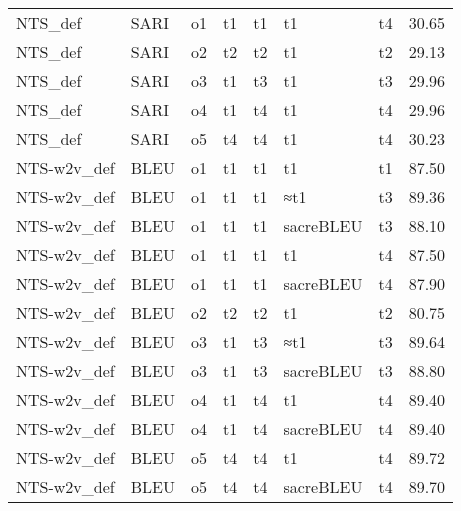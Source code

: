 \begin{tabular}{lllllllr}
     NTS\_def &      SARI &     o1 &         t1 &       t1 &         t1 &           t4 &                   30.65 \\
     NTS\_def &      SARI &     o2 &         t2 &       t2 &         t1 &           t2 &                   29.13 \\
     NTS\_def &      SARI &     o3 &         t1 &       t3 &         t1 &           t3 &                   29.96 \\
     NTS\_def &      SARI &     o4 &         t1 &       t4 &         t1 &           t4 &                   29.96 \\
     NTS\_def &      SARI &     o5 &         t4 &       t4 &         t1 &           t4 &                   30.23 \\
 NTS-w2v\_def &      BLEU &     o1 &         t1 &       t1 &         t1 &           t1 &                   87.50 \\
 NTS-w2v\_def &      BLEU &     o1 &         t1 &       t1 &        ≈t1 &           t3 &                   89.36 \\
 NTS-w2v\_def &      BLEU &     o1 &         t1 &       t1 &  sacreBLEU &           t3 &                   88.10 \\
 NTS-w2v\_def &      BLEU &     o1 &         t1 &       t1 &         t1 &           t4 &                   87.50 \\
 NTS-w2v\_def &      BLEU &     o1 &         t1 &       t1 &  sacreBLEU &           t4 &                   87.90 \\
 NTS-w2v\_def &      BLEU &     o2 &         t2 &       t2 &         t1 &           t2 &                   80.75 \\
 NTS-w2v\_def &      BLEU &     o3 &         t1 &       t3 &        ≈t1 &           t3 &                   89.64 \\
 NTS-w2v\_def &      BLEU &     o3 &         t1 &       t3 &  sacreBLEU &           t3 &                   88.80 \\
 NTS-w2v\_def &      BLEU &     o4 &         t1 &       t4 &         t1 &           t4 &                   89.40 \\
 NTS-w2v\_def &      BLEU &     o4 &         t1 &       t4 &  sacreBLEU &           t4 &                   89.40 \\
 NTS-w2v\_def &      BLEU &     o5 &         t4 &       t4 &         t1 &           t4 &                   89.72 \\
 NTS-w2v\_def &      BLEU &     o5 &         t4 &       t4 &  sacreBLEU &           t4 &                   89.70 \\

\end{tabular}
